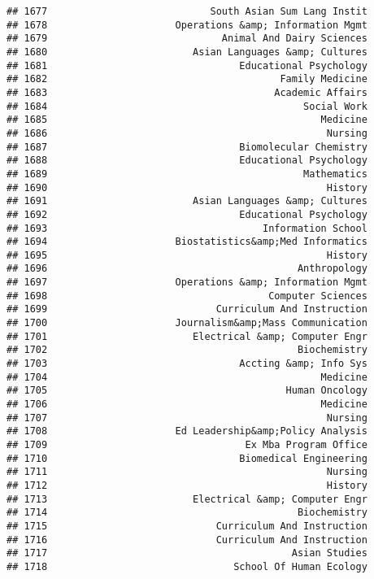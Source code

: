 \documentclass[
]{article}
\begin{document}
\begin{verbatim}
## 1677                            South Asian Sum Lang Instit
## 1678                      Operations &amp; Information Mgmt
## 1679                              Animal And Dairy Sciences
## 1680                         Asian Languages &amp; Cultures
## 1681                                 Educational Psychology
## 1682                                        Family Medicine
## 1683                                       Academic Affairs
## 1684                                            Social Work
## 1685                                               Medicine
## 1686                                                Nursing
## 1687                                 Biomolecular Chemistry
## 1688                                 Educational Psychology
## 1689                                            Mathematics
## 1690                                                History
## 1691                         Asian Languages &amp; Cultures
## 1692                                 Educational Psychology
## 1693                                     Information School
## 1694                      Biostatistics&amp;Med Informatics
## 1695                                                History
## 1696                                           Anthropology
## 1697                      Operations &amp; Information Mgmt
## 1698                                      Computer Sciences
## 1699                             Curriculum And Instruction
## 1700                      Journalism&amp;Mass Communication
## 1701                         Electrical &amp; Computer Engr
## 1702                                           Biochemistry
## 1703                                 Accting &amp; Info Sys
## 1704                                               Medicine
## 1705                                         Human Oncology
## 1706                                               Medicine
## 1707                                                Nursing
## 1708                      Ed Leadership&amp;Policy Analysis
## 1709                                  Ex Mba Program Office
## 1710                                 Biomedical Engineering
## 1711                                                Nursing
## 1712                                                History
## 1713                         Electrical &amp; Computer Engr
## 1714                                           Biochemistry
## 1715                             Curriculum And Instruction
## 1716                             Curriculum And Instruction
## 1717                                          Asian Studies
## 1718                                School Of Human Ecology

\end{verbatim}
\end{document}
